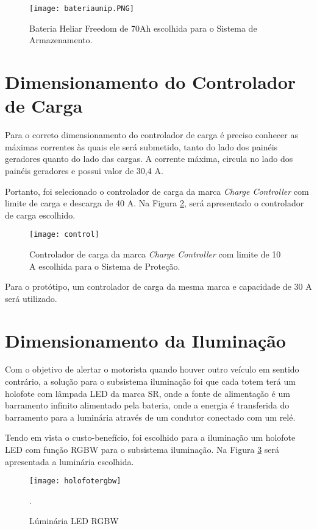 \begin{figure}[H]
\centering
\texttt{[image: bateriaunip.PNG]}
\caption{Bateria Heliar Freedom de 70Ah escolhida para o Sistema de Armazenamento.}
\label{fig:bateriaunip}
\end{figure}

\section{Dimensionamento do Controlador de Carga}

Para o correto dimensionamento do controlador de carga é preciso conhecer as máximas correntes às quais ele será submetido, tanto do lado dos painéis geradores quanto do lado das cargas. A corrente máxima, circula no lado dos painéis geradores e possui valor de 30,4 A.

Portanto, foi selecionado o controlador de carga da marca \textit{Charge Controller} com limite de carga e descarga de 40 A. Na Figura \ref{fig:control}, será apresentado o controlador de carga escolhido.

\begin{figure}[H]
\centering
\texttt{[image: control]}
    \caption{Controlador de carga da marca \textit{Charge Controller} com limite de 10 A escolhida para o Sistema de Proteção.}
\label{fig:control}
\end{figure}


Para o protótipo, um controlador de carga da mesma marca e capacidade de 30 A será utilizado.

\section{Dimensionamento da Iluminação}

Com o objetivo de alertar o motorista quando houver outro veículo em sentido contrário, a solução para o subsistema iluminação foi que cada totem terá um holofote com lâmpada LED da marca SR, onde a fonte de alimentação é um barramento infinito alimentado pela bateria, onde a energia é transferida do barramento para a luminária através de um condutor conectado com um relé. 

Tendo em vista o custo-benefício, foi escolhido para a iluminação um holofote LED com função RGBW para o subsistema iluminação. Na Figura \ref{fig:holofotergbw} será apresentada a luminária escolhida.

\begin{figure}[H]
\centering
\texttt{[image: holofotergbw]}
\caption{Lúminária LED RGBW}. 
\label{fig:holofotergbw}
\end{figure}



